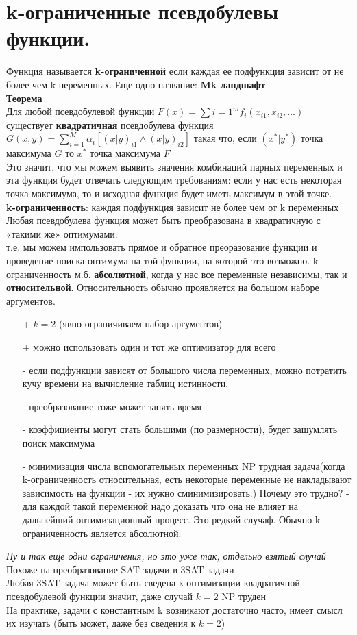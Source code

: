\section{k-ограниченные псевдобулевы функции.}
Функция называется \textbf{k-ограниченной} если каждая ее подфункция зависит от не более чем k переменных. Еще одно название:\textbf{ Mk ландшафт}\\
\textbf{Теорема}\\
Для любой псевдобулевой функции $F(x) = \sum\limits{i=1}^m f_{i}(x_{i1}, x_{i2},...)$ существует \textbf{квадратичная} псевдобулева функция $G(x,y)=\sum\limits_{i=1}^M \alpha_i[(x|y)_{i1}\land(x|y)_{i2}]$ такая что, если $(x^*|y^*)$ точка максимума $G$ то $x^*$ точка максимума $F$\\
Это значит, что мы можем выявить значения комбинаций парных переменных и эта функция будет отвечать следующим требованиям: если у нас есть некоторая точка максимума, то и исходная функция будет иметь максимум в этой точке. \\
\textbf{k-ограниченность}: каждая подфункция зависит не более чем от k переменных\\
Любая псевдобулева функция может быть преобразована в квадратичную с
«такими же» оптимумами:\\
т.е. мы можем импользовать прямое и обратное преоразование функции и проведение поиска оптимума на той функции, на которой это возможно.
k-ограниченность м.б. \textbf{абсолютной}, когда у нас все переменные независимы, так и \textbf{относительной}. Относительность обычно проявляется на большом наборе аргументов.
\begin{itemize}
    \item[+] $k=2$ (явно ограничиваем набор аргументов)
    \item[+] можно использовать один и тот же оптимизатор для всего
    \item[-] если подфункции зависят от большого числа переменных, можно потратить кучу времени на вычисление таблиц истинности. 
    \item[-] преобразование тоже может занять время
    \item[-] коэффициенты могут стать большими (по размерности), будет зашумлять поиск максимума
    \item[-] минимизация числа вспомогательных переменных NP трудная задача(когда k-ограниченность относительная, есть некоторые переменные не накладывают зависимость на функции - их нужно сминимизировать.) Почему это трудно? - для каждой такой переменной надо доказать что она не влияет на дальнейший оптимизационный процесс. Это редкий случаф. Обычно k-ограниченность является абсолютной.
\end{itemize}
\textit{Ну и так еще одни ограничения, но это уже так, отдельно взятый случай}\\
Похоже на преобразование SAT задачи в 3SAT задачи\\
Любая 3SAT задача может быть сведена к оптимизации квадратичной псевдобулевой функции значит, даже случай $k=2$ NP труден \\
На практике, задачи с константным k возникают достаточно часто, имеет смысл
их изучать (быть может, даже без сведения к $k=2$)
